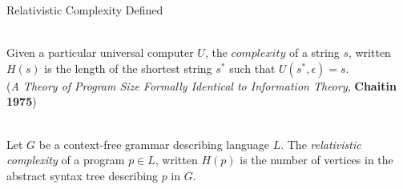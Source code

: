 \documentclass{beamer}
\begin{document}
\begin{frame}{Relativistic Complexity Defined}

{
\\
Given a particular universal computer $U$, the $complexity$ of a string $s$,
written $H(s)$
is the length of the shortest string $s^*$ such that $U(s^*, \epsilon) = s$.\\
(\textit{A Theory of Program Size Formally Identical to Information Theory},
\textbf{Chaitin 1975})

}


\medskip

\medskip

{\\
Let $G$ be a context-free grammar describing language $L$.
The \emph{relativistic complexity} of a program $p \in L$, written $H(p)$ is
the number of vertices in the abstract syntax tree describing $p$ in $G$.
}

\medskip

\color{red}{The difference: absolute complexity fixes the code and varies the
program, relativistic complexity fixes the program and varies the code!}

\end{frame}

\end{document}
